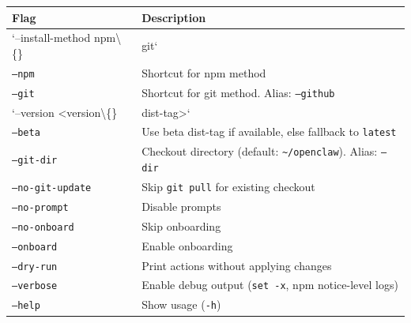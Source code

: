 \begin{table}[h]
\centering
\small
\begin{tabular}{|l|l|}
\hline
Flag & Description \\
\hline
`--install-method npm\textbackslash\{\} & git` \\
\hline
\texttt{--npm} & Shortcut for npm method \\
\hline
\texttt{--git} & Shortcut for git method. Alias: \texttt{--github} \\
\hline
`--version <version\textbackslash\{\} & dist-tag>` \\
\hline
\texttt{--beta} & Use beta dist-tag if available, else fallback to \texttt{latest} \\
\hline
\texttt{--git-dir } & Checkout directory (default: \texttt{\textasciitilde{}/openclaw}). Alias: \texttt{--dir} \\
\hline
\texttt{--no-git-update} & Skip \texttt{git pull} for existing checkout \\
\hline
\texttt{--no-prompt} & Disable prompts \\
\hline
\texttt{--no-onboard} & Skip onboarding \\
\hline
\texttt{--onboard} & Enable onboarding \\
\hline
\texttt{--dry-run} & Print actions without applying changes \\
\hline
\texttt{--verbose} & Enable debug output (\texttt{set -x}, npm notice-level logs) \\
\hline
\texttt{--help} & Show usage (\texttt{-h}) \\
\hline
\end{tabular}
\end{table}






